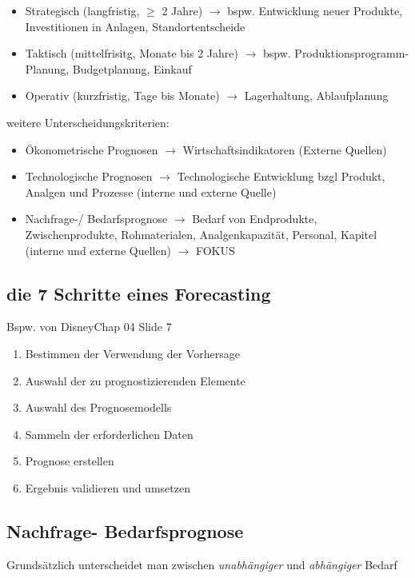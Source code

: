 \documentclass{report}
\theoremstyle{definition}
\theoremstyle{example}
\begin{document}
\begin{itemize}
   \item Strategisch (langfristig, $\geq$ 2 Jahre) $\rightarrow$ bspw. Entwicklung neuer Produkte, Investitionen in Anlagen, Standortentscheide
   \item Taktisch (mittelfrisitg, Monate bis 2 Jahre) $\rightarrow$ bspw. Produktionsprogramm-Planung, Budgetplanung, Einkauf
   \item Operativ (kurzfristig, Tage bis Monate) $\rightarrow$ Lagerhaltung, Ablaufplanung
\end{itemize}

weitere Unterscheidungskriterien:
\begin{itemize}
   \item Ökonometrische Prognosen $\rightarrow$ Wirtschaftsindikatoren (Externe Quellen)
   \item Technologische Prognosen $\rightarrow$ Technologische Entwicklung bzgl Produkt, Analgen und Prozesse (interne und externe Quelle)
   \item Nachfrage-/ Bedarfsprognose $\rightarrow$ Bedarf von Endprodukte, Zwischenprodukte, Rohmaterialen, Analgenkapazität, Personal, Kapitel (interne und externe Quellen) $\rightarrow$ FOKUS
\end{itemize}

   \subsection{die 7 Schritte eines Forecasting}
Bspw. von DisneyChap 04 Slide 7\\

\begin{enumerate}
   \item Bestimmen der Verwendung der Vorhersage
   \item Auswahl der zu prognostizierenden Elemente 
   \item Auswahl des Prognosemodells
   \item Sammeln der erforderlichen Daten
   \item Prognose erstellen
   \item Ergebnis validieren und umsetzen
\end{enumerate}

   \subsection{Nachfrage- Bedarfsprognose}
Grundsätzlich unterscheidet man zwischen \textit{unabhängiger} und \textit{abhängiger} Bedarf\\
\end{document}
